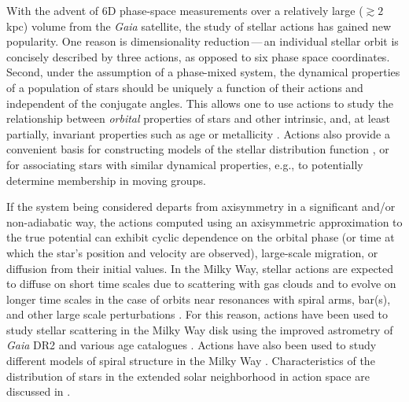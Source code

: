 \documentclass[twocolumn]{aastex62}
\begin{document}
With the advent of 6D phase-space measurements over a relatively large
($\gtrsim 2$ kpc) volume from the \textit{Gaia} satellite, the study of
stellar actions has gained new popularity. One reason is dimensionality
reduction\,---\,an individual stellar orbit is concisely described by three
actions, as opposed to six phase space coordinates. Second, under the
assumption of a phase-mixed system, the dynamical properties of a population
of stars should be uniquely a function of their actions and independent of the
conjugate angles. This allows one to use actions to study the relationship
between \emph{orbital} properties of stars and other intrinsic, and, at least
partially, invariant properties such as age or metallicity
\citep{2018ApJ...867...31B, 2018arXiv180803278T, 2018MNRAS.481.4093S,
2019arXiv190304030G, 2019arXiv190309320D, 2019MNRAS.486.1167B}. Actions also
provide a convenient basis for constructing models of the stellar distribution
function \citep[e.g.,][]{1915MNRAS..76...70J, 1985ApJ...295..388V,
2017ApJ...839...61T}, or for associating stars with similar dynamical
properties, e.g., to potentially determine membership in moving groups.

If the system being considered departs from axisymmetry in a significant
and/or non-adiabatic way, the actions computed using an axisymmetric
approximation to the true potential can exhibit cyclic dependence on the
orbital phase (or time at which the star's position and velocity are
observed), large-scale migration, or diffusion from their initial values. In
the Milky Way, stellar actions are expected to diffuse on short time scales
due to scattering with gas clouds and to evolve on longer time scales in the
case of orbits near resonances with spiral arms, bar(s), and other large scale
perturbations \citep{2014RvMP...86....1S}. For this reason, actions have been
used to study stellar scattering in the Milky Way disk using the improved
astrometry of \textit{Gaia} DR2 and various age catalogues
\citep{2018ApJ...867...31B, 2018arXiv180803278T}. Actions have also been used
to study different models of spiral structure in the Milky Way
\citep{2019MNRAS.tmp..155S}. Characteristics of the distribution of stars in
the extended solar neighborhood in action space are discussed in
\citet{2019MNRAS.484.3291T}.
\end{document}
